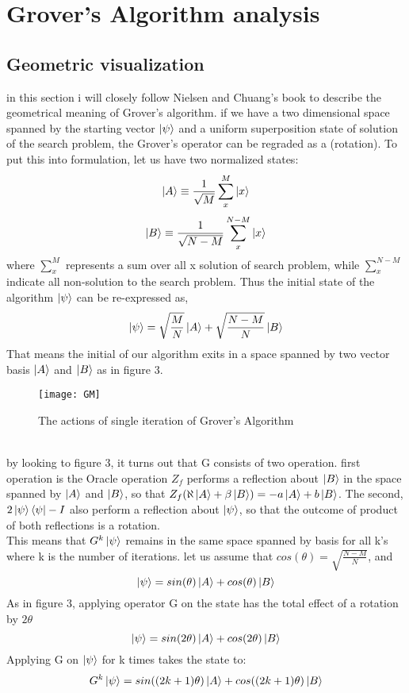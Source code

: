 \documentclass[11pt]{article}
\begin{document}
\section{Grover's Algorithm analysis}
\subsection{Geometric visualization}
in this section i will closely follow Nielsen and Chuang's book to describe the geometrical meaning of Grover's algorithm. if we have a two dimensional space spanned by the starting vector $\ket{\psi}$ and a uniform superposition state of solution of the search problem, the Grover's operator can be regraded as a (rotation). To put this into formulation, let us have two normalized states:
\begin{equation}
\ket{A} \equiv \frac{1}{\sqrt{M}}\sum_{x}^{M}\ket{x}
\end{equation}
\begin{equation}
\ket{B} \equiv \frac{1}{\sqrt{N-M}}\sum_{x}^{N-M}\ket{x}
\end{equation}
where $\sum_{x}^{M}$ represents a sum over all x solution of search problem, while $\sum_{x}^{N-M}$ indicate all non-solution to the search problem. Thus the initial state of the algorithm $\ket{\psi}$ can be re-expressed as, 
\begin{equation}
\ket{\psi} = \sqrt{\frac{M}{N}}\ket{A}+\sqrt{\frac{N-M}{N}}\ket{B}
\end{equation}
That means the initial of our algorithm exits in a space spanned by two vector basis $\ket{A}$ and $\ket{B}$ as in figure 3.
\begin{figure}[h]
	\texttt{[image: GM]}
	\centering
	\caption{The actions of single iteration of Grover's Algorithm}
\end{figure}\\
by looking to figure 3, it turns out that G consists of two operation. first operation is the Oracle operation $Z_f$ performs a reflection about $\ket{B}$ in the space spanned by $\ket{A}$ and $\ket{B}$, so that $Z_f(\aleph\ket{A}+\beta\ket{B})= -a\ket{A}+b\ket{B}$. The second, $2\ket{\psi}\bra{\psi}-I$ also perform a reflection about $\ket{\psi}$, so that the outcome of product of both reflections is a rotation.\\
This means that $G^k\ket{\psi}$ remains in the same space spanned by basis for all k's where k is the number of iterations. let us assume that $cos(\theta )= \sqrt{\frac{N-M}{N}}$, and 
\begin{equation}
\ket{\psi}= sin(\theta)\ket{A}+cos(\theta)\ket{B}
\end{equation}
As in figure 3, applying operator G on the state has the total effect of a rotation by $2\theta$ 
\begin{equation}
\ket{\psi}= sin(2\theta)\ket{A}+cos(2\theta)\ket{B}
\end{equation}
Applying G on $\ket{\psi}$ for k times takes the state to:
\begin{equation}
G^k \ket{\psi}=sin((2k+1)\theta)\ket{A}+cos((2k+1)\theta)\ket{B}
\end{equation} 
\end{document}
